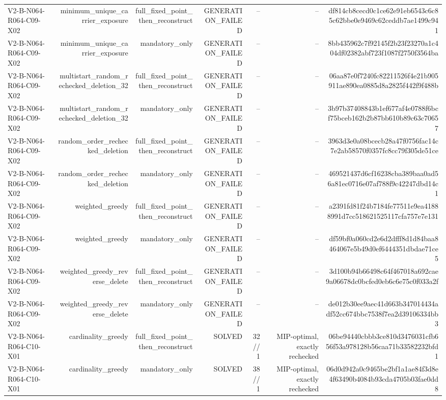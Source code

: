 {\begin{longtable}{lrrrrrr}
V2-B-N064-R064-C09-X02 & minimum\_unique\_carrier\_exposure & full\_fixed\_point\_then\_reconstruct & GENERATION\_FAILED & -- & -- & df814cb8cecd0c1ce62e91eb6543c6c85c62bbe0e9469c62ceddb7ae1499c941 \\
V2-B-N064-R064-C09-X02 & minimum\_unique\_carrier\_exposure & mandatory\_only & GENERATION\_FAILED & -- & -- & 8bb435962c7f92145f2b23f23270a1c404df02382abf723f1087f2750f3564ba \\
V2-B-N064-R064-C09-X02 & multistart\_random\_rechecked\_deletion\_32 & full\_fixed\_point\_then\_reconstruct & GENERATION\_FAILED & -- & -- & 06aa87e0f7240fc82211526f4e21b905911ae890ea0885d8a2825f442f9f488b \\
V2-B-N064-R064-C09-X02 & multistart\_random\_rechecked\_deletion\_32 & mandatory\_only & GENERATION\_FAILED & -- & -- & 3b97b37408843b1ef677af4e0788f6bcf75bceb162b2b87bb610b89c63c70657 \\
V2-B-N064-R064-C09-X02 & random\_order\_rechecked\_deletion & full\_fixed\_point\_then\_reconstruct & GENERATION\_FAILED & -- & -- & 3963d3e0a08bcecb28a47f0756fac14c7e2ab58570f0357fc8cc79f305de51ce \\
V2-B-N064-R064-C09-X02 & random\_order\_rechecked\_deletion & mandatory\_only & GENERATION\_FAILED & -- & -- & 469521437d6cf16238cba389baa0ad56a81ec0716e07af788f9c42247dbd14c1 \\
V2-B-N064-R064-C09-X02 & weighted\_greedy & full\_fixed\_point\_then\_reconstruct & GENERATION\_FAILED & -- & -- & a2391fd81f24b7184fe77511e9ea41888991d7cc518621525117cfa757e7e131 \\
V2-B-N064-R064-C09-X02 & weighted\_greedy & mandatory\_only & GENERATION\_FAILED & -- & -- & df59bf0a060cd2e6d2dfff8d1d84baa8464067e5b49d0ef6444351dbdae71ce5 \\
V2-B-N064-R064-C09-X02 & weighted\_greedy\_reverse\_delete & full\_fixed\_point\_then\_reconstruct & GENERATION\_FAILED & -- & -- & 3d100b94b66498c64f467018a692cae9a06678dc0bcfed0eb6c6e75c0f033a2f \\
V2-B-N064-R064-C09-X02 & weighted\_greedy\_reverse\_delete & mandatory\_only & GENERATION\_FAILED & -- & -- & de012b30ee9aec41d663b347014434adf52cc674bbc7538f7ea2d39106334bb3 \\
V2-B-N064-R064-C10-X01 & cardinality\_greedy & full\_fixed\_point\_then\_reconstruct & SOLVED & 32//1 & MIP-optimal, exactly rechecked & 06be94440cbbb3ce810d3476031cfb656f53a978128b56caa71b33582232bfd1 \\
V2-B-N064-R064-C10-X01 & cardinality\_greedy & mandatory\_only & SOLVED & 38//1 & MIP-optimal, exactly rechecked & 06d0d942a0c9465be2bf1a1ae84f3d8e4f63490b4084b93cda4705b03fae0dd8 \\

\end{longtable}}
